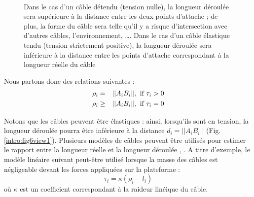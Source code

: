 \begin{figure}[!ht]
  \centering
       \hfill
     \\
    \caption{\footnotesize{Dans le cas d'un câble détendu (tension nulle), la longueur déroulée sera supérieure à la distance entre les deux points d'attache ; de plus, la forme du câble sera telle qu'il y a risque d'intersection avec d'autres câbles, l'environnement, \dots. Dans le cas d'un câble élastique tendu (tension strictement positive), la longueur déroulée sera inférieure à la distance entre les points d'attache correspondant à la longueur réelle du câble}}
\label{intro:fig6}
\end{figure}

Nous partons donc des relations suivantes :
\begin{eqnarray}
\rho_i &=& ||A_i B_i||, \hbox{ if } \tau_i > 0 \\ 
\rho_i &\geq& ||A_i B_i||, \hbox{ if } \tau_i = 0
\label{intro:eq1}
\end{eqnarray}

Notons que les câbles peuvent être élastiques : ainsi, lorsqu'ils sont en tension, la longueur déroulée pourra être inférieure à la distance $d_i = ||A_i B_i||$ (Fig.\ref{intro:fig6view1}). Plusieurs modèles de câbles peuvent être utilisés pour estimer le rapport entre la longueur réelle et la longueur déroulée \cite{1974IrvineCaughey}, \cite{2006:Kozak.ea}. A titre d'exemple, le modèle linéaire suivant peut-être utilisé lorsque la masse des câbles est négligeable devant les forces appliquées sur la plateforme :
$$\tau_i = \kappa(\rho_i - l_i)$$
où $\kappa$ est un coefficient correspondant à la raideur linéique du câble.

